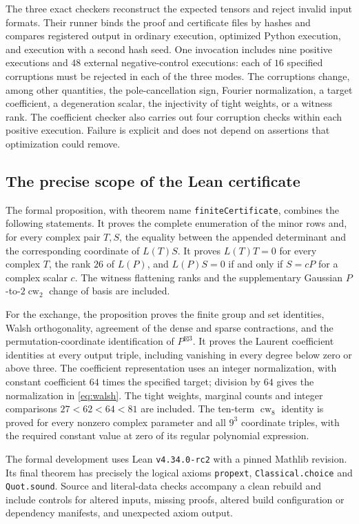 \documentclass[10pt,a4paper]{article}
\theoremstyle{definition}
\theoremstyle{remark}
\numberwithin{equation}{section}
\begin{document}
The three exact checkers reconstruct the expected tensors and reject
invalid input formats. Their runner binds the proof and certificate
files by hashes and compares registered output in ordinary execution,
optimized Python execution, and execution with a second hash seed.
One invocation includes nine positive executions and $48$ external
negative-control executions: each of $16$ specified corruptions must
be rejected in each of the three modes. The corruptions change, among
other quantities, the pole-cancellation sign, Fourier normalization,
a target coefficient, a degeneration scalar, the injectivity of tight
weights, or a witness rank. The coefficient checker also carries out
four corruption checks within each positive execution. Failure is
explicit and does not depend on assertions that optimization could
remove.

\subsection{The precise scope of the Lean certificate}

The formal proposition, with theorem name
\texttt{finiteCertificate}, combines the following statements.
It proves the complete enumeration of the minor rows and, for every
complex pair $T,S$, the equality between the appended determinant
and the corresponding coordinate of $L(T)S$. It proves $L(T)T=0$
for every complex $T$, the rank $26$ of $L(P)$, and
$L(P)S=0$ if and only if $S=cP$ for a complex scalar $c$.
The witness flattening ranks and the supplementary Gaussian
$P$-to-$2\operatorname{cw}_2$ change of basis are included.

For the exchange, the proposition proves the finite group and set
identities, Walsh orthogonality, agreement of the dense and sparse
contractions, and the permutation-coordinate identification of
$P^{\boxtimes3}$. It proves the Laurent coefficient identities at
every output triple, including vanishing in every degree below zero
or above three. The coefficient representation uses an integer
normalization, with constant coefficient $64$ times the specified
target; division by $64$ gives the normalization in
\eqref{eq:walsh}. The tight weights, marginal counts and integer
comparisons $27<62<64<81$ are included. The ten-term
$\operatorname{cw}_8$ identity is proved for every nonzero complex
parameter and all $9^3$ coordinate triples, with the required
constant value at zero of its regular polynomial expression.

The formal development uses Lean \texttt{v4.34.0-rc2} with a pinned
Mathlib revision. Its final theorem has precisely the logical
axioms \texttt{propext}, \texttt{Classical.choice} and
\texttt{Quot.sound}. Source and literal-data checks accompany a
clean rebuild and include controls for altered inputs, missing
proofs, altered build configuration or dependency manifests, and
unexpected axiom output.
\end{document}
